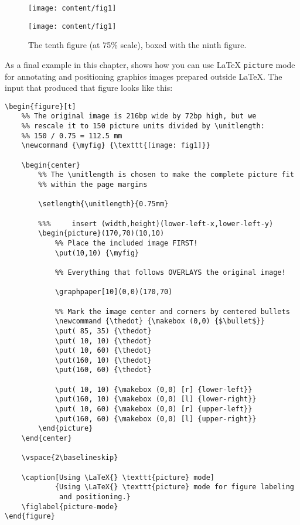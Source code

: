 \begin{figure}[t]
    \centerline{\texttt{[image: content/fig1]}}
    \caption[The ninth figure (at 50\% scale)]%
            {The ninth figure (at 50\% scale), boxed with the tenth figure.}
    \vspace{3ex}
    \centerline{\texttt{[image: content/fig1]}}
    \caption[The tenth figure (at 75\% scale)]%
            {The tenth figure (at 75\% scale), boxed with the ninth figure.}%
\end{figure}

\blah

\blah

\blah

As a final example in this chapter, 
shows how you can use \LaTeX{} \texttt{picture} mode for
annotating and positioning graphics images prepared outside
\LaTeX{}.  The input that produced that figure looks like
this:

%
\begin{verbatim}
\begin{figure}[t]
    %% The original image is 216bp wide by 72bp high, but we
    %% rescale it to 150 picture units divided by \unitlength:
    %% 150 / 0.75 = 112.5 mm
    \newcommand {\myfig} {\texttt{[image: fig1]}}

    \begin{center}
        %% The \unitlength is chosen to make the complete picture fit
        %% within the page margins

        \setlength{\unitlength}{0.75mm}

        %%%     insert (width,height)(lower-left-x,lower-left-y)
        \begin{picture}(170,70)(10,10)
            %% Place the included image FIRST!
            \put(10,10) {\myfig}

            %% Everything that follows OVERLAYS the original image!

            \graphpaper[10](0,0)(170,70)

            %% Mark the image center and corners by centered bullets
            \newcommand {\thedot} {\makebox (0,0) {$\bullet$}}
            \put( 85, 35) {\thedot}
            \put( 10, 10) {\thedot}
            \put( 10, 60) {\thedot}
            \put(160, 10) {\thedot}
            \put(160, 60) {\thedot}

            \put( 10, 10) {\makebox (0,0) [r] {lower-left}}
            \put(160, 10) {\makebox (0,0) [l] {lower-right}}
            \put( 10, 60) {\makebox (0,0) [r] {upper-left}}
            \put(160, 60) {\makebox (0,0) [l] {upper-right}}
        \end{picture}
    \end{center}

    \vspace{2\baselineskip}

    \caption[Using \LaTeX{} \texttt{picture} mode]
            {Using \LaTeX{} \texttt{picture} mode for figure labeling
             and positioning.}
    \figlabel{picture-mode}
\end{figure}
\end{verbatim}

